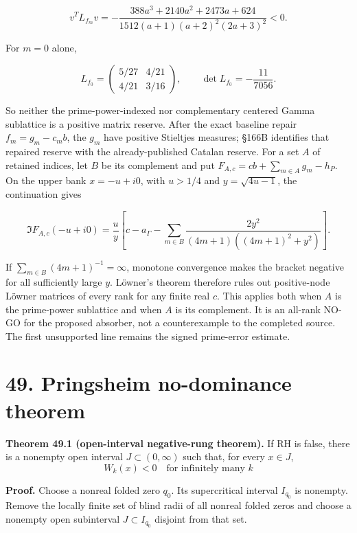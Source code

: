 \documentclass[
  11pt,
]{book}
\renewenvironment{quote}
  {\begin{tcolorbox}[
      enhanced,
      breakable,
      colback=tncream,
      colframe=tnrust,
      boxrule=0.8pt,
      arc=1.5pt,
      left=7pt,
      right=7pt,
      top=6pt,
      bottom=6pt]}
  {\end{tcolorbox}}
\begin{document}
\[
\boxed{v^TL_{f_m}v
=-\frac{388a^3+2140a^2+2473a+624}
{1512(a+1)(a+2)^2(2a+3)^2}<0.}
\tag{48.41}
\]

For \(m=0\) alone,

\[
L_{f_0}=\begin{pmatrix}5/27&4/21\\4/21&3/16\end{pmatrix},
\qquad \det L_{f_0}=-\frac{11}{7056}.
\tag{48.42}
\]

So neither the prime-power-indexed nor complementary centered Gamma
sublattice is a positive matrix reserve. After the exact baseline repair
\(f_m=g_m-c_mb\), the \(g_m\) have positive Stieltjes measures; §166B
identifies that repaired reserve with the already-published Catalan
reserve. For a set \(A\) of retained indices, let \(B\) be its
complement and put \(F_{A,c}=cb+\sum_{m\in A}g_m-h_P\). On the upper
bank \(x=-u+i0\), with \(u>1/4\) and \(y=\sqrt{4u-1}\), the continuation
gives

\[
\boxed{\Im F_{A,c}(-u+i0)=\frac{u}{y}\left[c-a_\Gamma-
\sum_{m\in B}\frac{2y^2}{(4m+1)((4m+1)^2+y^2)}\right].}
\tag{48.43}
\]

If \(\sum_{m\in B}(4m+1)^{-1}=\infty\), monotone convergence makes the
bracket negative for all sufficiently large \(y\). Löwner's theorem
therefore rules out positive-node Löwner matrices of every rank for any
finite real \(c\). This applies both when \(A\) is the prime-power
sublattice and when \(A\) is its complement. It is an all-rank NO-GO for
the proposed absorber, not a counterexample to the completed source. The
first unsupported line remains the signed prime-error estimate.

\section{49. Pringsheim no-dominance
theorem}\label{pringsheim-no-dominance-theorem}

\begin{quote}
\textbf{Theorem 49.1 (open-interval negative-rung theorem).} If RH is
false, there is a nonempty open interval \(J\subset(0,\infty)\) such
that, for every \(x\in J\), \[
W_k(x)<0
\quad\text{for infinitely many }k
\tag{49.1}
\]
\end{quote}

\textbf{Proof.} Choose a nonreal folded zero \(q_0\). Its supercritical
interval \(I_{q_0}\) is nonempty. Remove the locally finite set of blind
radii of all nonreal folded zeros and choose a nonempty open subinterval
\(J\subset I_{q_0}\) disjoint from that set.
\end{document}
